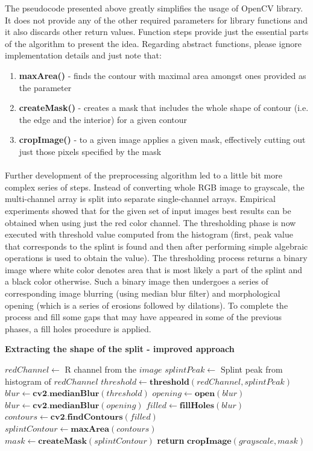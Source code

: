 The pseudocode presented above greatly simplifies the usage of OpenCV library. It does not provide any of the other required parameters for library functions and it also discards other return values. Function steps provide just the essential parts of the algorithm to present the idea. Regarding abstract functions, please ignore implementation details and just note that:
\begin{enumerate}
	\item \textbf{maxArea()} - finds the contour with maximal area amongst ones provided as the parameter
	\item \textbf{createMask()} - creates a mask that includes the whole shape of contour (i.e. the edge and the interior) for a given contour
	\item \textbf{cropImage()} - to a given image applies a given mask, effectively cutting out just those pixels specified by the mask 
\end{enumerate}

\paragraph{}
Further development of the preprocessing algorithm led to a little bit more complex series of steps. Instead of converting whole RGB image to grayscale, the multi-channel array is split into separate single-channel arrays. Empirical experiments showed that for the given set of input images best results can be obtained when using just the red color channel. The thresholding phase is now executed with threshold value computed from the histogram (first, peak value that corresponds to the splint is found and then after performing simple algebraic operations is used to obtain the value). The thresholding process returns a binary image where white color denotes area that is most likely a part of the splint and a black color otherwise. Such a binary image then undergoes a series of corresponding image blurring (using median blur filter) and morphological opening (which is a series of erosions followed by dilations). To complete the process and fill some gaps that may have appeared in some of the previous phases, a fill holes procedure is applied.

\begin{algorithm}{\textbf{Extracting the shape of the split - improved approach}}
	\begin{algorithmic}[1]
			\State $redChannel \gets$ R channel from the $image$
			\State $splintPeak \gets$ Splint peak from histogram of $redChannel$
			\State $threshold \gets \textbf{threshold}(redChannel, splintPeak)$
			\State $blur \gets \textbf{cv2.medianBlur}(threshold)$
				\State $opening \gets \textbf{open}(blur)$
				\State $blur \gets \textbf{cv2.medianBlur}(opening)$
			\EndFor
			\State $filled \gets \textbf{fillHoles}(blur)$
			\State $contours \gets \textbf{cv2.findContours}(filled)$
			\State $splintContour \gets \textbf{maxArea}(contours)$
			\State $mask \gets \textbf{createMask}(splintContour)$
			\State \textbf{return} $\textbf{cropImage}(grayscale, mask)$
		\EndFunction
	\end{algorithmic}	
\end{algorithm}

